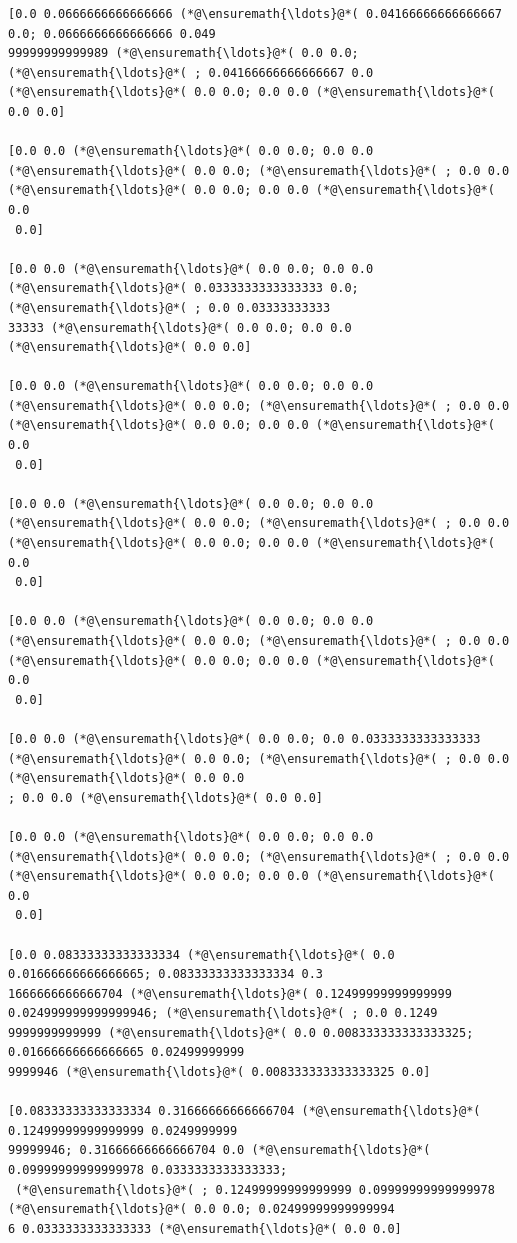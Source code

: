 \documentclass[12pt,a4paper]{article}
\begin{document}
\begin{lstlisting}
[0.0 0.0666666666666666 (*@\ensuremath{\ldots}@*( 0.04166666666666667 0.0; 0.0666666666666666 0.049
99999999999989 (*@\ensuremath{\ldots}@*( 0.0 0.0; (*@\ensuremath{\ldots}@*( ; 0.04166666666666667 0.0 (*@\ensuremath{\ldots}@*( 0.0 0.0; 0.0 0.0 (*@\ensuremath{\ldots}@*( 
0.0 0.0]

[0.0 0.0 (*@\ensuremath{\ldots}@*( 0.0 0.0; 0.0 0.0 (*@\ensuremath{\ldots}@*( 0.0 0.0; (*@\ensuremath{\ldots}@*( ; 0.0 0.0 (*@\ensuremath{\ldots}@*( 0.0 0.0; 0.0 0.0 (*@\ensuremath{\ldots}@*( 0.0
 0.0]

[0.0 0.0 (*@\ensuremath{\ldots}@*( 0.0 0.0; 0.0 0.0 (*@\ensuremath{\ldots}@*( 0.0333333333333333 0.0; (*@\ensuremath{\ldots}@*( ; 0.0 0.03333333333
33333 (*@\ensuremath{\ldots}@*( 0.0 0.0; 0.0 0.0 (*@\ensuremath{\ldots}@*( 0.0 0.0]

[0.0 0.0 (*@\ensuremath{\ldots}@*( 0.0 0.0; 0.0 0.0 (*@\ensuremath{\ldots}@*( 0.0 0.0; (*@\ensuremath{\ldots}@*( ; 0.0 0.0 (*@\ensuremath{\ldots}@*( 0.0 0.0; 0.0 0.0 (*@\ensuremath{\ldots}@*( 0.0
 0.0]

[0.0 0.0 (*@\ensuremath{\ldots}@*( 0.0 0.0; 0.0 0.0 (*@\ensuremath{\ldots}@*( 0.0 0.0; (*@\ensuremath{\ldots}@*( ; 0.0 0.0 (*@\ensuremath{\ldots}@*( 0.0 0.0; 0.0 0.0 (*@\ensuremath{\ldots}@*( 0.0
 0.0]

[0.0 0.0 (*@\ensuremath{\ldots}@*( 0.0 0.0; 0.0 0.0 (*@\ensuremath{\ldots}@*( 0.0 0.0; (*@\ensuremath{\ldots}@*( ; 0.0 0.0 (*@\ensuremath{\ldots}@*( 0.0 0.0; 0.0 0.0 (*@\ensuremath{\ldots}@*( 0.0
 0.0]

[0.0 0.0 (*@\ensuremath{\ldots}@*( 0.0 0.0; 0.0 0.0333333333333333 (*@\ensuremath{\ldots}@*( 0.0 0.0; (*@\ensuremath{\ldots}@*( ; 0.0 0.0 (*@\ensuremath{\ldots}@*( 0.0 0.0
; 0.0 0.0 (*@\ensuremath{\ldots}@*( 0.0 0.0]

[0.0 0.0 (*@\ensuremath{\ldots}@*( 0.0 0.0; 0.0 0.0 (*@\ensuremath{\ldots}@*( 0.0 0.0; (*@\ensuremath{\ldots}@*( ; 0.0 0.0 (*@\ensuremath{\ldots}@*( 0.0 0.0; 0.0 0.0 (*@\ensuremath{\ldots}@*( 0.0
 0.0]

[0.0 0.08333333333333334 (*@\ensuremath{\ldots}@*( 0.0 0.01666666666666665; 0.08333333333333334 0.3
1666666666666704 (*@\ensuremath{\ldots}@*( 0.12499999999999999 0.024999999999999946; (*@\ensuremath{\ldots}@*( ; 0.0 0.1249
9999999999999 (*@\ensuremath{\ldots}@*( 0.0 0.008333333333333325; 0.01666666666666665 0.02499999999
9999946 (*@\ensuremath{\ldots}@*( 0.008333333333333325 0.0]

[0.08333333333333334 0.31666666666666704 (*@\ensuremath{\ldots}@*( 0.12499999999999999 0.0249999999
99999946; 0.31666666666666704 0.0 (*@\ensuremath{\ldots}@*( 0.09999999999999978 0.0333333333333333;
 (*@\ensuremath{\ldots}@*( ; 0.12499999999999999 0.09999999999999978 (*@\ensuremath{\ldots}@*( 0.0 0.0; 0.02499999999999994
6 0.0333333333333333 (*@\ensuremath{\ldots}@*( 0.0 0.0]


\end{lstlisting}
\end{document}
